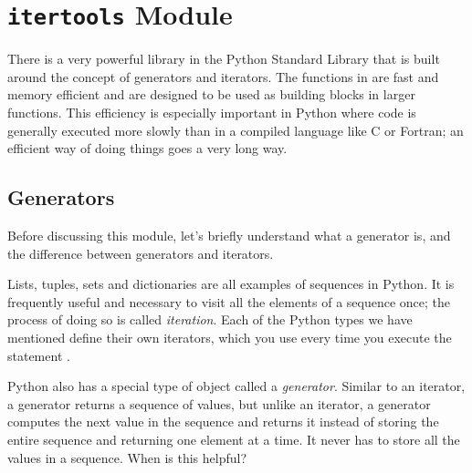 \section*{\texttt{itertools} Module}
There is a very powerful library in the Python Standard Library that is built around the concept
of generators and iterators.  The functions in  are fast and memory efficient and are designed to be used as
building blocks in larger functions. 
This efficiency is especially important in Python where code is generally executed more slowly than in a compiled language like C or Fortran; an efficient way of doing things goes a very long way.

\subsection*{Generators}
Before discussing this module, let's briefly understand what a generator is, and the difference between generators and iterators.

Lists, tuples, sets and dictionaries are all examples of sequences in Python. It is frequently useful and necessary to visit all the elements of a sequence once; the process of doing so is called \emph{iteration}.
Each of the Python types we have mentioned define their own iterators, which you use every time you execute the statement .

Python also has a special type of object called a \emph{generator}.
Similar to an iterator, a generator returns a sequence of values, but unlike an iterator, a generator computes the next value in the sequence and returns it instead of storing the entire sequence and returning one element at a time. It never has to store all the values in a sequence. When is this helpful?


